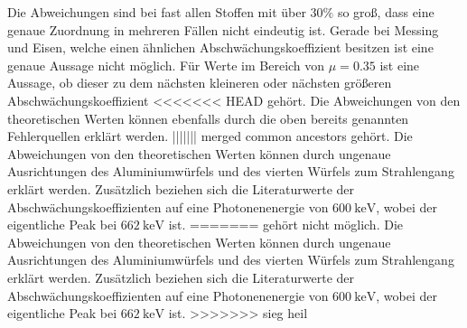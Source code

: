 Die Abweichungen sind bei fast allen Stoffen mit über $30\%$ so groß, dass
eine genaue Zuordnung in mehreren Fällen nicht eindeutig ist. Gerade bei Messing und
Eisen, welche einen ähnlichen Abschwächungskoeffizient besitzen ist eine genaue
Aussage nicht möglich. Für Werte im Bereich von $\mu = 0.35$ ist eine Aussage, ob
dieser zu dem nächsten kleineren oder nächsten größeren Abschwächungskoeffizient
<<<<<<< HEAD
gehört. Die Abweichungen von den theoretischen Werten können ebenfalls durch
die oben bereits genannten Fehlerquellen erklärt werden.
||||||| merged common ancestors
gehört. Die Abweichungen von den theoretischen Werten können durch ungenaue Ausrichtungen des
Aluminiumwürfels und des vierten Würfels zum Strahlengang erklärt werden.
Zusätzlich beziehen sich die Literaturwerte der Abschwächungskoeffizienten auf
eine Photonenenergie von $\SI{600}{\kilo\eV}$, wobei der eigentliche Peak
bei $\SI{662}{\kilo\eV}$ ist.
=======
gehört nicht möglich. Die Abweichungen von den theoretischen Werten können durch ungenaue Ausrichtungen des
Aluminiumwürfels und des vierten Würfels zum Strahlengang erklärt werden.
Zusätzlich beziehen sich die Literaturwerte der Abschwächungskoeffizienten auf
eine Photonenenergie von $\SI{600}{\kilo\eV}$, wobei der eigentliche Peak
bei $\SI{662}{\kilo\eV}$ ist.
>>>>>>> sieg heil
